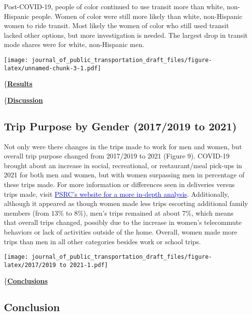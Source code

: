 \documentclass[
  12pt,
]{article}
\begin{document}
Post-COVID-19, people of color continued to use transit more than white,
non-Hispanic people. Women of color were still more likely than white,
non-Hispanic women to ride transit. Most likely the women of color who
still used transit lacked other options, but more investigation is
needed. The largest drop in transit mode shares were for white,
non-Hispanic men.

\texttt{[image: journal\_of\_public\_transportation\_draft\_files/figure-latex/unnamed-chunk-3-1.pdf]}

\{\underline{\textbf{Results}}

\{\underline{\textbf{Discussion}}

\hypertarget{trip-purpose-by-gender-20172019-to-2021}{%
\subsection{Trip Purpose by Gender (2017/2019 to
2021)}\label{trip-purpose-by-gender-20172019-to-2021}}

\begin{flushleft}
Not only were there changes in the trips made to work for men and women, but overall trip purpose changed from 2017/2019 to 2021 (Figure 9). COVID-19 brought about an increase in social, recreational, or restaurant/meal pick-ups in 2021 for both men and women, but with women surpassing men in percentage of these trips made. For more information or differences seen in deliveries versus trips made, visit \href{https://www.psrc.org/media/7054}{\underline{\textcolor{blue}{PSRC's website for a more in-depth analysis}}}. Additionally, although it appeared as though women made less trips escorting additional family members (from 13\% to 8\%), men's trips remained at about 7\%, which means that overall trips changed, possibly due to the increase in women's telecommute behaviors or lack of activities outside of the home. Overall, women made more trips than men in all other categories besides work or school trips. 
\end{flushleft}

\texttt{[image: journal\_of\_public\_transportation\_draft\_files/figure-latex/2017/2019 to 2021-1.pdf]}

\{\underline{\textbf{Conclusions}}

\hypertarget{conclusion}{%
\subsection{Conclusion}\label{conclusion}}
\end{document}
